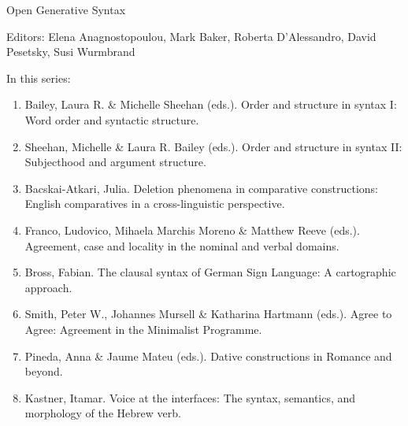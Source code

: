 {\large Open Generative Syntax}

\bigskip

Editors:   Elena Anagnostopoulou,
    Mark Baker,
    Roberta D’Alessandro,
    David Pesetsky,
    Susi Wurmbrand


\bigskip

In this series:

\begin{enumerate}
\item Bailey, Laura R. \& Michelle Sheehan (eds.). Order and structure in syntax I: Word order and syntactic structure.
\item Sheehan, Michelle \& Laura R. Bailey (eds.).  Order and structure in syntax II: Subjecthood and argument structure.
\item Bacskai-Atkari, Julia. Deletion phenomena in comparative constructions: English comparatives in a cross-linguistic perspective.
\item Franco, Ludovico, Mihaela Marchis Moreno \& Matthew Reeve (eds.). Agreement, case and locality in the nominal and verbal domains.
\item Bross, Fabian. The clausal syntax of German Sign Language: A cartographic approach.
\item Smith, Peter W., Johannes Mursell \& Katharina Hartmann (eds.). Agree to Agree: Agreement in the Minimalist Programme.
\item Pineda, Anna \& Jaume Mateu (eds.). Dative constructions in Romance and beyond.
\item Kastner, Itamar. Voice at the interfaces: The syntax, semantics, and morphology of the Hebrew verb.
\end{enumerate}



\vfill


